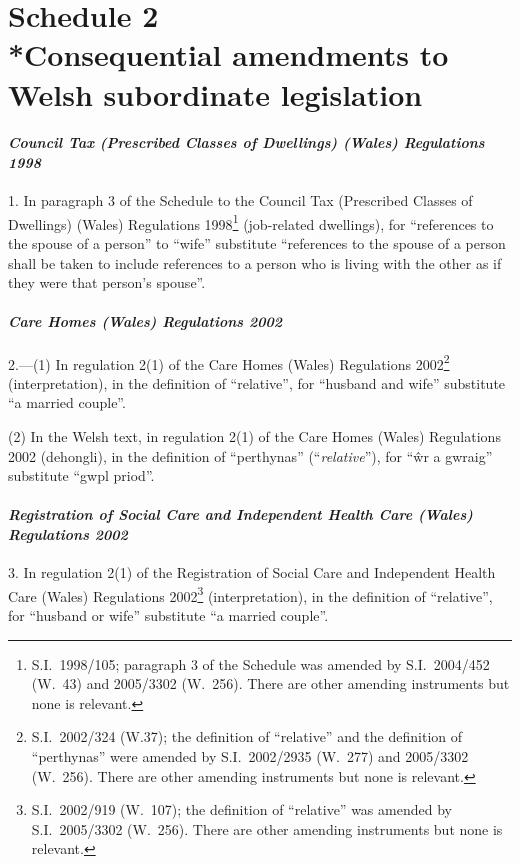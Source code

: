 \documentclass[12pt,a4paper]{article}
\begin{document}
\part[Schedule 2 --- Consequential amendments to Welsh subordinate legislation]{Schedule 2\\*Consequential amendments to Welsh subordinate legislation}

\subsection*{\itshape Council Tax (Prescribed Classes of Dwellings) (Wales) Regulations 1998}

1.  In paragraph 3 of the Schedule to the Council Tax (Prescribed Classes of Dwellings) (Wales) Regulations 1998\footnote{S.I.~1998/105; paragraph 3 of the Schedule was amended by S.I.~2004/452 (W.~43) and 2005/3302 (W.~256). There are other amending instruments but none is relevant.} (job-related dwellings), for “references to the spouse of a person” to “wife” substitute “references to the spouse of a person shall be taken to include references to a person who is living with the other as if they were that person’s spouse”.

\subsection*{\itshape Care Homes (Wales) Regulations 2002}

2.—(1) In regulation 2(1) of the Care Homes (Wales) Regulations 2002\footnote{S.I.~2002/324 (W.37); the definition of “relative” and the definition of “perthynas” were amended by S.I.~2002/2935 (W.~277) and 2005/3302 (W.~256). There are other amending instruments but none is relevant.} (interpretation), in the definition of “relative”, for “husband and wife” substitute “a married couple”.

(2) In the Welsh text, in regulation 2(1) of the Care Homes (Wales) Regulations 2002 (\foreignlanguage{welsh}{dehongli}), in the definition of \foreignlanguage{welsh}{“perthynas”} (“\emph{relative}”), for \foreignlanguage{welsh}{“\^wr a gwraig”} substitute \foreignlanguage{welsh}{“gwpl priod”.}

\subsection*{\itshape Registration of Social Care and Independent Health Care (Wales) Regulations 2002}

3.  In regulation 2(1) of the Registration of Social Care and Independent Health Care (Wales) Regulations 2002\footnote{S.I.~2002/919 (W.~107); the definition of “relative” was amended by S.I.~2005/3302 (W.~256). There are other amending instruments but none is relevant.} (interpretation), in the definition of “relative”, for “husband or wife” substitute “a married couple”.
\end{document}
